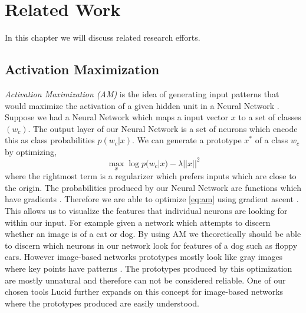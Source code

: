 \chapter{Related Work} \label{sect-related}
In this chapter we will discuss related research efforts.

\section{Activation Maximization}
\emph{Activation Maximization (AM)} is the idea of generating input patterns that would maximize the activation of a given hidden unit in a Neural Network \cite{simonyan2014deep}\cite{10.1162/neco.2006.18.8.1868}\cite{articlec}. Suppose we had a Neural Network which maps a input vector $x$ to a set of classes $(w_{c})$. The output layer of our Neural Network is a set of neurons which encode this as class probabilities $p(w_{c}|x)$. We can generate a prototype $x^{*}$ of a class $w_{c}$ by optimizing,
\begin{equation}
    \max_{x} \log p(w_{c}|x) - \lambda||x||^{2}
    \label{eq:am}
\end{equation}
where the rightmost term is a regularizer which prefers inputs which are close to the origin. The probabilities produced by our Neural Network are functions which have gradients \cite{10.5555/525960}. Therefore we are able to optimize \ref{eq:am} using gradient ascent \cite{DBLP:journals/corr/Ruder16}. This allows us to visualize the features that individual neurons are looking for within our input. For example given a network which attempts to discern whether an image is of a cat or dog. By using AM we theoretically should be able to discern which neurons in our network look for features of a dog such as floppy ears. However image-based networks prototypes mostly look like gray images where key points have patterns \cite{simonyan2014deep}. The prototypes produced by this optimization are mostly unnatural and therefore can not be considered reliable. One of our chosen tools Lucid further expands on this concept for image-based networks where the prototypes produced are easily understood. 


